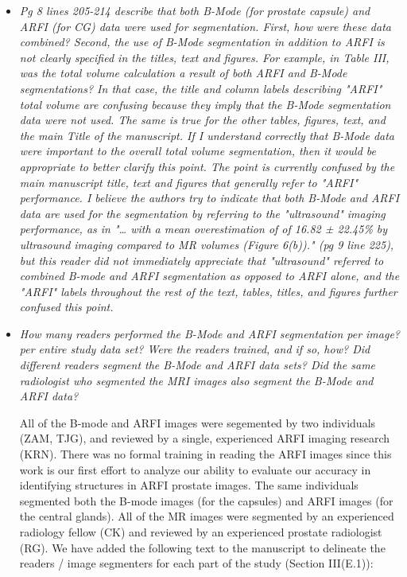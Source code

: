 \documentclass[10pt]{article}
\begin{document}
\begin{itemize}
    \item \textit{Pg 8 lines 205-214 describe that both B-Mode (for prostate
            capsule) and ARFI (for CG) data were used for segmentation.  First,
            how were these data combined?  Second, the use of B-Mode
            segmentation in addition to ARFI is not clearly specified in the
            titles, text and figures.  For example, in Table III, was the total
            volume calculation a result of both ARFI and B-Mode segmentations?
            In that case, the title and column labels describing "ARFI" total
            volume are confusing because they imply that the B-Mode
            segmentation data were not used.  The same is true for the other
            tables, figures, text, and the main Title of the manuscript.  If I
            understand correctly that B-Mode data were important to the overall
            total volume segmentation, then it would be appropriate to better
            clarify this point.  The point is currently confused by the main
            manuscript title, text and figures that generally refer to "ARFI"
            performance.  I believe the authors try to indicate that both
            B-Mode and ARFI data are used for the segmentation by referring to
            the "ultrasound" imaging performance, as in "… with a mean
            overestimation of of 16.82 ± 22.45\% by ultrasound imaging compared
            to MR volumes (Figure 6(b))." (pg 9 line 225), but this reader did
            not immediately appreciate that "ultrasound" referred to combined
            B-mode and ARFI segmentation as opposed to ARFI alone, and the
            "ARFI" labels throughout the rest of the text, tables, titles, and
            figures further confused this point.}

    \item \textit{How many readers performed the B-Mode and ARFI segmentation
            per image? per entire study data set? Were the readers trained, and
            if so, how?  Did different readers segment the B-Mode and ARFI data
            sets?  Did the same radiologist who segmented the MRI images also
            segment the B-Mode and ARFI data?}

    All of the B-mode and ARFI images were segemented by two individuals (ZAM,
    TJG), and reviewed by a single, experienced ARFI imaging research (KRN).
    There was no formal training in reading the ARFI images since this work is
    our first effort to analyze our ability to evaluate our accuracy in
    identifying structures in ARFI prostate images.  The same individuals
    segmented both the B-mode images (for the capsules) and ARFI images (for
    the central glands).  All of the MR images were segmented by an experienced
    radiology fellow (CK) and reviewed by an experienced prostate radiologist
    (RG).  We have added the following text to the manuscript to delineate the
    readers / image segmenters for each part of the study (Section III(E.1)):


\end{itemize}
\end{document}
